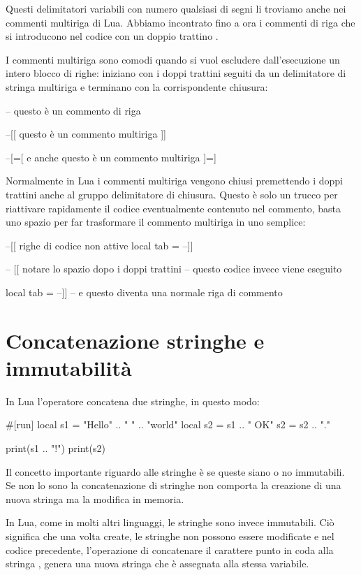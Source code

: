 Questi delimitatori variabili con numero qualsiasi di segni \key{=} li troviamo
anche nei commenti multiriga di Lua. Abbiamo incontrato fino a ora i commenti di
riga che si introducono nel codice con un doppio trattino \key{--}.

I commenti multiriga sono comodi quando si vuol escludere dall'esecuzione un
intero blocco di righe: iniziano con i doppi trattini seguiti da un delimitatore
di stringa multiriga e terminano con la corrispondente chiusura:
\begin{lines}
-- questo è un commento di riga

--[[
questo è un commento
multiriga
]]

--[=[
e anche questo è un commento
multiriga
]=]
\end{lines}

Normalmente in Lua i commenti multiriga vengono chiusi premettendo i doppi
trattini anche al gruppo delimitatore di chiusura. Questo è solo un trucco per
riattivare rapidamente il codice eventualmente contenuto nel commento, basta uno
spazio per far trasformare il commento multiriga in uno semplice:
\begin{lines}
--[[ righe di codice non attive
local tab = {}
--]]

-- [[ notare lo spazio dopo i doppi trattini
-- questo codice invece viene eseguito

local tab = {}
--]] -- e questo diventa una normale riga di commento
\end{lines}


\section{Concatenazione stringhe e immutabilità}

In Lua l'operatore  concatena due stringhe, in questo modo:
\begin{lines}
#[run]
local s1 = "Hello" .. " " .. "world"
local s2 = s1 .. " OK"
s2 = s2 .. "."

print(s1 .. "!")
print(s2)
\end{lines}

Il concetto importante riguardo alle stringhe è se queste siano o no immutabili.
Se non lo sono la concatenazione di stringhe non comporta la creazione di una
nuova stringa ma la modifica in memoria.

In Lua, come in molti altri linguaggi, le stringhe sono invece immutabili.
Ciò significa che una volta create, le stringhe non possono essere modificate e
nel codice precedente, l'operazione di concatenare il carattere punto in coda
alla stringa , genera una nuova stringa che è assegnata alla stessa
variabile.

